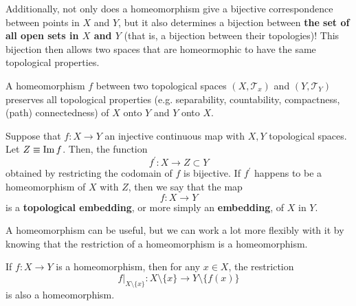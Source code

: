   Additionally, not only does a homeomorphism give a bijective correspondence between points in $X$ and $Y$, but it also determines a bijection between \textbf{the set of all open sets in $X$ and $Y$} (that is, a bijection between their topologies)! This bijection then allows two spaces that are homeormophic to have the same topological properties. 

  \begin{theorem}
    A homeomorphism $f$ between two topological spaces $(X, \mathscr{T}_{x})$ and $(Y, \mathscr{T}_{Y})$ preserves all topological properties (e.g. separability, countability, compactness, (path) connectedness) of $X$ onto $Y$ and $Y$ onto $X$. 
  \end{theorem}

  \begin{definition}[Embedding]
    Suppose that $f: X \longrightarrow Y$ an injective continuous map with $X, Y$ topological spaces. Let $Z \equiv \operatorname{Im}{f}$. Then, the function
    \begin{equation}
      f^\prime: X \longrightarrow Z \subset Y
    \end{equation}
    obtained by restricting the codomain of $f$ is bijective. If $f^\prime$ happens to be a homeomorphism of $X$ with $Z$, then we say that the map
    \begin{equation}
      f: X \longrightarrow Y
    \end{equation}
    is a \textbf{topological embedding}, or more simply an \textbf{embedding}, of $X$ in $Y$. 
  \end{definition} 

  A homeomorphism can be useful, but we can work a lot more flexibly with it by knowing that the restriction of a homeomorphism is a homeomorphism. 

  \begin{theorem}
    If $f: X \rightarrow Y$ is a homeomorphism, then for any $x \in X$, the restriction 
    \begin{equation}
      f|_{X \setminus \{x\}} : X \setminus \{x\} \rightarrow Y \setminus \{f(x)\}
    \end{equation}
    is also a homeomorphism. 
  \end{theorem}


